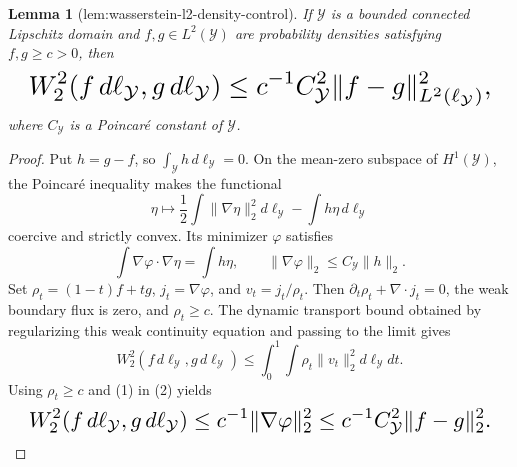 \documentclass{article}
\newtheorem{lemma}{Lemma}
\begin{document}
\begin{lemma}[lem:wasserstein-l2-density-control]\label{lem:wasserstein-l2-density-control}
If \(\mathcal Y\) is a bounded connected Lipschitz domain and \(f,g\in L^2(\mathcal Y)\) are probability densities satisfying \(f,g\ge c>0\), then
\[
\makebox[\linewidth][c]{\resizebox{0.98\linewidth}{!}{\par\noindent \makebox[\linewidth][c]{\resizebox{0.98\linewidth}{!}{\(\displaystyle \displaystyle W_2^2(f\,d\ell_{\mathcal Y},g\,d\ell_{\mathcal Y})\le c^{-1}C_{\mathcal Y}^2\lVert f-g\rVert_{L^2(\ell_{\mathcal Y})}^2,\)}}\par\noindent}}
\]
where \(C_{\mathcal Y}\) is a Poincar\'e constant of \(\mathcal Y\).
\end{lemma}
\begin{proof}
Put \(h=g-f\), so \(\int_{\mathcal Y}h\,d\ell_{\mathcal Y}=0\). On the mean-zero subspace of \(H^1(\mathcal Y)\), the Poincar\'e inequality makes the functional
\[\eta\mapsto\frac12\int\lVert\nabla\eta\rVert_2^2d\ell_{\mathcal Y}-\int h\eta\,d\ell_{\mathcal Y}\]
coercive and strictly convex. Its minimizer \(\varphi\) satisfies
\[\int\nabla\varphi\cdot\nabla\eta=\int h\eta,\qquad \lVert\nabla\varphi\rVert_2\le C_{\mathcal Y}\lVert h\rVert_2.\tag{1}\]
Set \(\rho_t=(1-t)f+tg\), \(j_t=\nabla\varphi\), and \(v_t=j_t/\rho_t\). Then \(\partial_t\rho_t+\nabla\cdot j_t=0\), the weak boundary flux is zero, and \(\rho_t\ge c\). The dynamic transport bound obtained by regularizing this weak continuity equation and passing to the limit gives
\[W_2^2(f\,d\ell_{\mathcal Y},g\,d\ell_{\mathcal Y})\le\int_0^1\!\int\rho_t\lVert v_t\rVert_2^2d\ell_{\mathcal Y}dt.\tag{2}\]
Using \(\rho_t\ge c\) and (1) in (2) yields
\[
\makebox[\linewidth][c]{\resizebox{0.98\linewidth}{!}{\par\noindent \makebox[\linewidth][c]{\resizebox{0.98\linewidth}{!}{\(\displaystyle \displaystyle W_2^2(f\,d\ell_{\mathcal Y},g\,d\ell_{\mathcal Y})\le c^{-1}\lVert\nabla\varphi\rVert_2^2\le c^{-1}C_{\mathcal Y}^2\lVert f-g\rVert_2^2.\)}}\par\noindent}}
\]
\end{proof}
\end{document}
